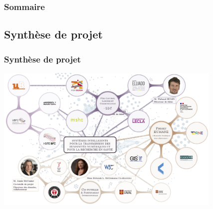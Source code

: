 \documentclass[xcolor=dvipsnames]{beamer}
\begin{document}
\begin{frame}
\frametitle{Sommaire}
\tableofcontents[currentsection]
\end{frame}

\subsection{Synthèse de projet}
\begin{frame}[fragile]
\frametitle{Synthèse de projet}
\includegraphics[height = 7cm]{images/mindmap.png}
\end{frame}


\end{document}

